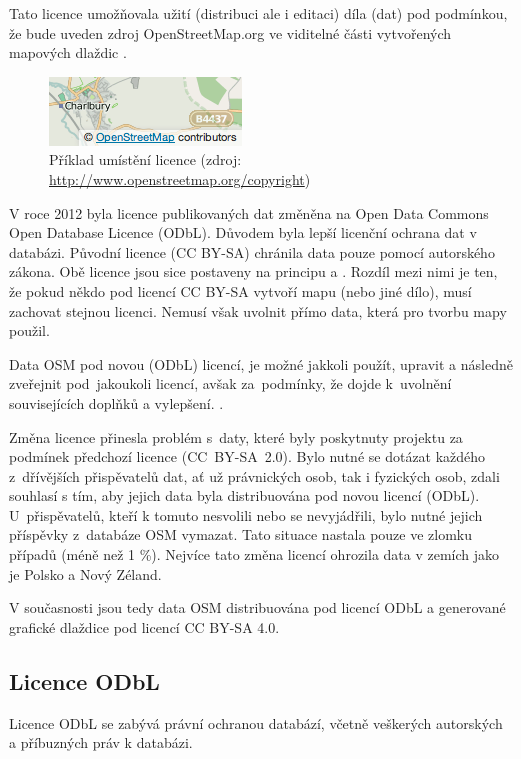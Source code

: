 Tato licence umožňovala užití (distribuci ale i editaci) díla (dat) pod podmínkou,
že bude uveden zdroj OpenStreetMap.org ve viditelné části
vytvořených mapových dlaždic \cite{OSMlicence}.

  \begin{figure}[hbt]
    \centering
      \includegraphics[scale=0.75]{./pictures/attribution_example.png}
      \caption{Příklad umístění licence 
                (zdroj: \url{http://www.openstreetmap.org/copyright})}
      \label{fig:attribution_example}
  \end{figure} 

V roce 2012 byla licence publikovaných dat změněna na Open Data Commons
Open Database Licence (ODbL).
Důvodem byla lepší licenční ochrana dat v databázi. 
Původní licence (CC BY-SA) chránila data pouze pomocí autorského zákona. 
Obě licence jsou sice postaveny na principu  a . Rozdíl mezi nimi je ten, že pokud někdo pod licencí CC BY-SA vytvoří mapu (nebo jiné dílo), musí zachovat stejnou licenci.
Nemusí však uvolnit přímo data, která pro tvorbu mapy použil.

Data OSM pod novou (ODbL) licencí, je možné jakkoli použít, upravit
a následně zveřejnit pod~jakoukoli licencí,
avšak za~podmínky, že dojde k~uvolnění souvisejících doplňků a vylepšení. \cite{OSMlicenceChange}.

Změna licence přinesla problém
s~daty, které byly poskytnuty projektu za podmínek předchozí licence
(CC~BY-SA~2.0). Bylo nutné se dotázat každého z~dřívějších
přispěvatelů dat, ať už právnických osob, tak i fyzických osob,
zdali souhlasí s tím, aby jejich data byla distribuována pod novou licencí (ODbL).
U~přispěvatelů, kteří k tomuto nesvolili nebo se nevyjádřili,
bylo nutné jejich příspěvky z~databáze OSM vymazat.
Tato situace nastala pouze ve zlomku případů (méně než 1 \%).
Nejvíce tato změna licencí ohrozila data v zemích jako je Polsko a Nový Zéland. \cite {OSMlicenceIssue}

V současnosti jsou tedy data OSM distribuována pod licencí ODbL a
generované grafické dlaždice pod licencí CC BY-SA 4.0. \cite{OSMlicence}

\subsection{Licence ODbL}
Licence ODbL
se zabývá právní ochranou databází, včetně
veškerých autorských a příbuzných práv k databázi.

